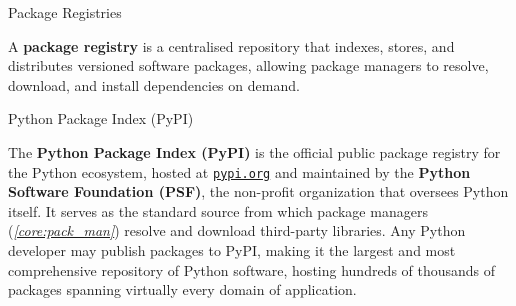\documentclass[10pt]{article}
\begin{document}
    \begin{core}[label=core:pack_reg]{Package Registries}

      A \textbf{package registry} is a centralised repository that indexes, stores, and distributes versioned software packages, allowing package managers to resolve, download, and install dependencies on demand.

    \end{core}

    \begin{core}[label=core:pypi]{Python Package Index (PyPI)}

      The \textbf{Python Package Index (PyPI)} is the official public package registry for the Python ecosystem, hosted at \href{https://pypi.org/}{\texttt{pypi.org}} and maintained by the \textbf{Python Software Foundation (PSF)}, the non-profit organization that oversees Python itself. It serves as the standard source from which package managers (\textit{\autoref{core:pack_man}}) resolve and download third-party libraries. Any Python developer may publish packages to PyPI, making it the largest and most comprehensive repository of Python software, hosting hundreds of thousands of packages spanning virtually every domain of application.

    \end{core}
\end{document}
